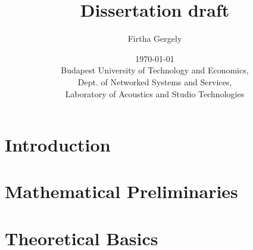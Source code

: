 \documentclass[12pt,a4paper]{report}
\title{ Dissertation draft}
\date{\today \\
Budapest University of Technology and Economics, \\ Dept. of Networked Systems and Services, \\ Laboratory of Acoustics and Studio Technologies}
\author{Firtha Gergely}
\begin{document}
%
\maketitle
\tableofcontents
\printnomenclature
%
\chapter{Introduction}
%
\chapter{Mathematical Preliminaries}
\label{sec:math}

%
\chapter{Theoretical Basics}
\label{sec:theory}

%
%

%




\end{document}
